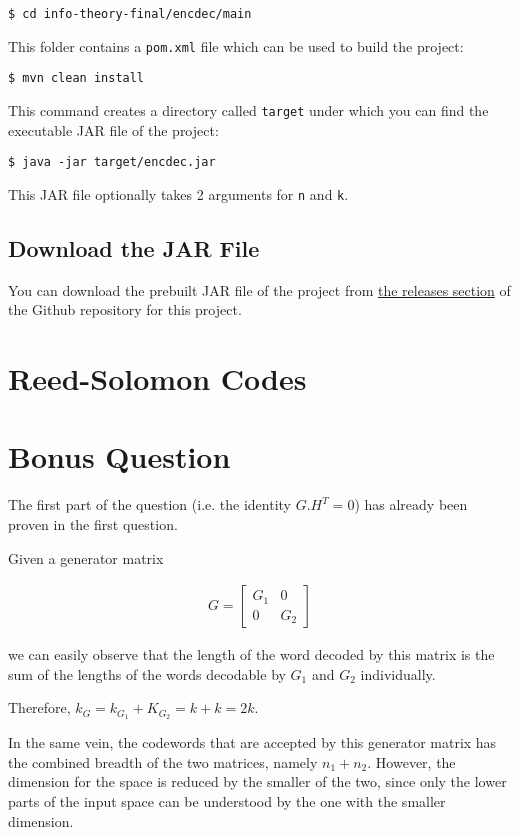 \documentclass{article}
\newcommand{\shellprompt}[1]{{%
\vspace{0.3in}%
\hangindent=0.5in%
\small{\texttt{\$ #1}}%
\vspace{0.3in}%
}}
\begin{document}
\shellprompt{cd info-theory-final/encdec/main}

This folder contains a \texttt{pom.xml} file which can be used to build the project:

\shellprompt{mvn clean install}

This command creates a directory called \texttt{target} under which you can find the
executable JAR file of the project:

\shellprompt{java -jar target/encdec.jar}

This JAR file optionally takes 2 arguments for \texttt{n} and \texttt{k}.

\subsection{Download the JAR File}

You can download the prebuilt JAR file of the project from \href{https://github.com/zsadeghi/info-theory-final/releases/tag/release}{the releases section}
of the Github repository for this project.

\section{Reed-Solomon Codes}

\section{Bonus Question}

The first part of the question (i.e. the identity $G.H^T=0$) has already been proven
in the first question.

Given a generator matrix

\begin{align*}
  G = \begin{bmatrix}
    G_1 & 0 \\
    0 & G_2
  \end{bmatrix}
\end{align*}

we can easily observe that the length of the word decoded by this matrix is the sum
of the lengths of the words decodable by $G_1$ and $G_2$ individually.

Therefore, $k_G=k_{G_1} + K_{G_2}=k+k=2k$.

In the same vein, the codewords that are accepted by this generator matrix has the
combined breadth of the two matrices, namely $n_1+n_2$. However, the dimension for
the space is reduced by the smaller of the two, since only the lower parts of the
input space can be understood by the one with the smaller dimension.
\end{document}
